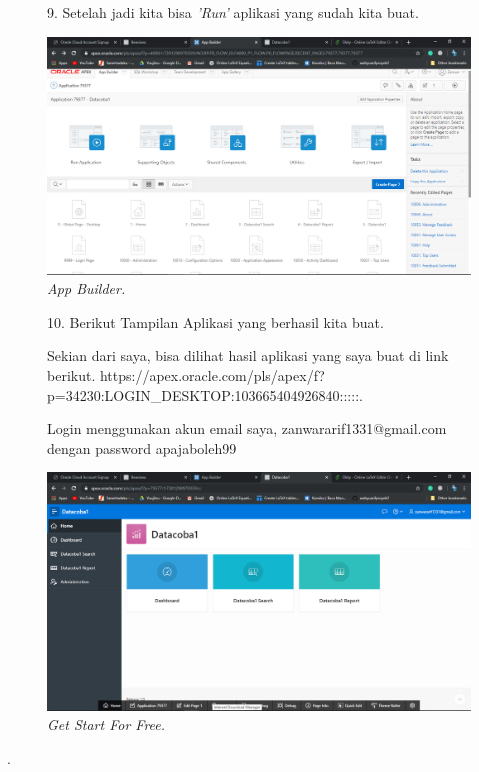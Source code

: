\begin{enumerate}
    \begin{figure}[!htbp]
    \item[9.] Setelah jadi kita bisa \textit{'Run'} aplikasi yang sudah kita buat.
    \begin{center}
    \includegraphics[scale=0.3]{figures/Screenshot(79).png}
    \caption{\textit{App Builder.}}
    \end{center}   
    \end{figure}
    
    \begin{figure}[!htbp]
    \item[10.] Berikut Tampilan Aplikasi yang berhasil kita buat.
    \par
    Sekian dari saya, bisa dilihat hasil aplikasi yang saya buat di link berikut. https://apex.oracle.com/pls/apex/f?p=34230:LOGIN\_DESKTOP:103665404926840:::::. 
    \par
    Login menggunakan akun email saya, zanwararif1331@gmail.com dengan password apajaboleh99
    \begin{center}
    \includegraphics[scale=0.3]{figures/Screenshot(84).png}
    \caption{\textit{Get Start For Free.}}
    \end{center}   
    \end{figure}
    
\end{enumerate}

.